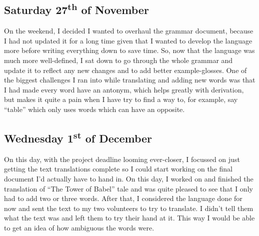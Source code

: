 \documentclass[a4paper,10pt]{article}
\begin{document}
\subsection{Saturday 27\textsuperscript{th} of November}
On the weekend, I decided I wanted to overhaul the grammar document, because I had not
updated it for a long time given that I wanted to develop the language more before writing
everything down to save time. So, now that the language was much more well-defined, I sat
down to go through the whole grammar and update it to reflect any new changes and to add
better example-glosses. One of the biggest challenges I ran into while translating and
adding new words was that I had made every word have an antonym, which helps greatly with
derivation, but makes it quite a pain when I have try to find a way to, for example, say
``table'' which only uses words which can have an opposite.

\subsection{Wednesday 1\textsuperscript{st} of December}
On this day, with the project deadline looming ever-closer, I focussed on just getting
the text translations complete so I could start working on the final document I'd actually
have to hand in. On this day, I worked on and finished the translation of ``The Tower of
Babel'' tale and was quite pleased to see that I only had to add two or three words. After
that, I considered the language done for now and sent the text to my two volunteers to try
to translate. I didn't tell them what the text was and left them to try their hand at it.
This way I would be able to get an idea of how ambiguous the words were.
\end{document}
